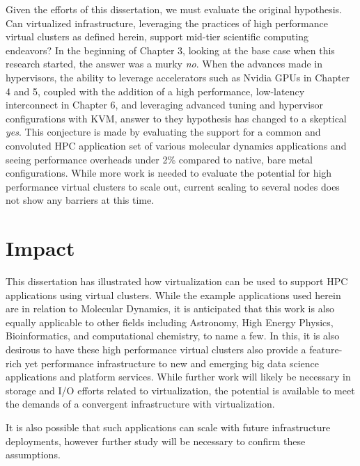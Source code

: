 Given the efforts of this dissertation, we must evaluate the original hypothesis.  Can virtualized infrastructure, leveraging the practices of high performance virtual clusters as defined herein, support mid-tier scientific computing endeavors? In the beginning of Chapter 3, looking at the base case when this research started, the answer was a murky \emph{no}.  When the advances made in hypervisors, the ability to leverage accelerators such as Nvidia GPUs in Chapter 4 and 5, coupled with the addition of a high performance, low-latency interconnect in Chapter 6, and leveraging advanced tuning and hypervisor configurations with KVM, answer to they hypothesis  has changed to a skeptical \emph{yes}.  This conjecture is made by evaluating the support for a common and convoluted HPC application set of various molecular dynamics applications and seeing performance overheads under 2\% compared to native, bare metal configurations.  While more work is needed to evaluate the potential for high performance virtual clusters to scale out, current scaling to several nodes does not show any barriers at this time.  





\section{Impact}
\label{sec:impact}

This dissertation has illustrated how virtualization can be used to support HPC applications using virtual clusters.  While the example applications used herein are in relation to Molecular Dynamics, it is anticipated that this work is also equally applicable to other fields including Astronomy, High Energy Physics, Bioinformatics, and computational chemistry, to name a few. In this, it is also desirous to have these high performance virtual clusters also provide a feature-rich yet performance infrastructure to new and emerging big data science applications and platform services.  While further work will likely be necessary in storage and I/O efforts related to virtualization, the potential is available to meet the demands of a convergent infrastructure with virtualization.   

It is also possible that such applications can scale with future infrastructure deployments, however further study will be necessary to confirm these assumptions.

